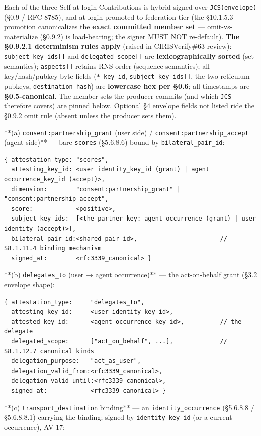 \documentclass[10pt]{article}
\begin{document}
Each of the three Self-at-login Contributions is hybrid-signed over \texttt{JCS(envelope)} (§0.9 / RFC 8785), and at login promoted to federation-tier (the §10.1.5.3 promotion canonicalizes the \textbf{exact committed member set} — omit-vs-materialize (§0.9.2) is load-bearing; the signer MUST NOT re-default). \textbf{The §0.9.2.1 determinism rules apply} (raised in CIRISVerify\#63 review): \texttt{subject\_key\_ids[]} and \texttt{delegated\_scope[]} are \textbf{lexicographically sorted} (set-semantics); \texttt{aspects[]} retains RNS order (sequence-semantics); all key/hash/pubkey byte fields (\texttt{*\_key\_id}, \texttt{subject\_key\_ids[]}, the two reticulum pubkeys, \texttt{destination\_hash}) are \textbf{lowercase hex per §0.6}; all timestamps are \textbf{§0.5-canonical}. The member sets the producer commits (and which \texttt{JCS} therefore covers) are pinned below. Optional §4 envelope fields not listed ride the §0.9.2 omit rule (absent unless the producer sets them).


**(a) \texttt{consent:partnership\_grant} (user side) / \texttt{consent:partnership\_accept} (agent side)** — bare \texttt{scores} (§5.6.8.6) bound by \texttt{bilateral\_pair\_id}:

\begin{lstlisting}
{ attestation_type: "scores",
  attesting_key_id: <user identity_key_id (grant) | agent occurrence_key_id (accept)>,
  dimension:        "consent:partnership_grant" | "consent:partnership_accept",
  score:            <positive>,
  subject_key_ids:  [<the partner key: agent occurrence (grant) | user identity (accept)>],
  bilateral_pair_id:<shared pair id>,                       // S8.1.11.4 binding mechanism
  signed_at:        <rfc3339_canonical> }
\end{lstlisting}

**(b) \texttt{delegates\_to} (user → agent occurrence)** — the act-on-behalf grant (§3.2 envelope shape):

\begin{lstlisting}
{ attestation_type:     "delegates_to",
  attesting_key_id:     <user identity_key_id>,
  attested_key_id:      <agent occurrence_key_id>,          // the delegate
  delegated_scope:      ["act_on_behalf", ...],             // S8.1.12.7 canonical kinds
  delegation_purpose:   "act_as_user",
  delegation_valid_from:<rfc3339_canonical>,
  delegation_valid_until:<rfc3339_canonical>,
  signed_at:            <rfc3339_canonical> }
\end{lstlisting}

**(c) \texttt{transport\_destination} binding** — an \texttt{identity\_occurrence} (§5.6.8.8 / §5.6.8.8.1) carrying the binding; signed by \texttt{identity\_key\_id} (or a current occurrence), AV-17:
\end{document}
